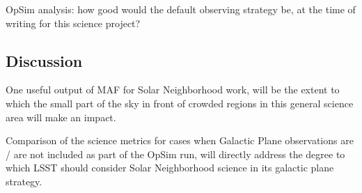 OpSim analysis: how good would the default observing strategy be, at
the time of writing for this science project?



\subsection{Discussion}
\label{sec:keyword:discussion}

One useful output of MAF for Solar Neighborhood work, will be the
extent to which the small part of the sky in front of crowded regions
in this general science area will make an impact. 

Comparison of the science metrics for cases when Galactic Plane
observations are / are not included as part of the OpSim run, will
directly address the degree to which LSST should consider Solar
Neighborhood science in its galactic plane strategy.




\navigationbar

